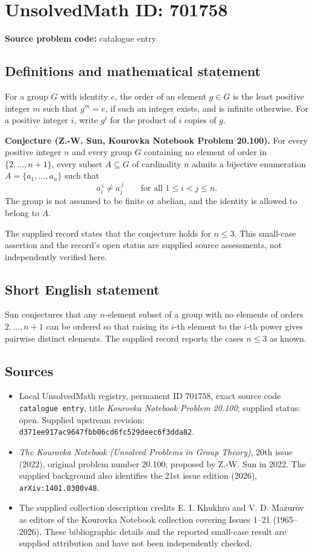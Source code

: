 \documentclass[11pt]{article}
\begin{document}
\section*{UnsolvedMath ID: 701758}
\textbf{Source problem code:} catalogue entry
\subsection{Definitions and mathematical statement}
For a group \(G\) with identity \(e\), the order of an element \(g\in G\) is the least positive integer \(m\) such that \(g^m=e\), if such an integer exists, and is infinite otherwise. For a positive integer \(i\), write \(g^i\) for the product of \(i\) copies of \(g\).

\textbf{Conjecture (Z.-W. Sun, Kourovka Notebook Problem 20.100).} For every positive integer \(n\) and every group \(G\) containing no element of order in \(\{2,\ldots,n+1\}\), every subset \(A\subseteq G\) of cardinality \(n\) admits a bijective enumeration \(A=\{a_1,\ldots,a_n\}\) such that
\[
 a_i^{\,i}\ne a_j^{\,j}\qquad\text{for all }1\le i<j\le n.
\]
The group is not assumed to be finite or abelian, and the identity is allowed to belong to \(A\).

The supplied record states that the conjecture holds for \(n\le 3\). This small-case assertion and the record's open status are supplied source assessments, not independently verified here.
\subsection{Short English statement}
Sun conjectures that any \(n\)-element subset of a group with no elements of orders \(2,\ldots,n+1\) can be ordered so that raising its \(i\)-th element to the \(i\)-th power gives pairwise distinct elements. The supplied record reports the cases \(n\le 3\) as known.
\subsection{Sources}
\begin{itemize}
\item Local UnsolvedMath registry, permanent ID \(701758\), exact source code \texttt{catalogue entry}, title \emph{Kourovka Notebook Problem 20.100}; supplied status: open. Supplied upstream revision: \texttt{d371ee917ac9647fbb06cd6fc529deec6f3dda82}.
\item \emph{The Kourovka Notebook (Unsolved Problems in Group Theory)}, 20th issue (2022), original problem number 20.100; proposed by Z.-W. Sun in 2022. The supplied background also identifies the 21st issue edition (2026), \texttt{arXiv:1401.0300v48}.
\item The supplied collection description credits E. I. Khukhro and V. D. Mazurov as editors of the Kourovka Notebook collection covering Issues 1--21 (1965--2026). These bibliographic details and the reported small-case result are supplied attribution and have not been independently checked.
\end{itemize}
\end{document}
